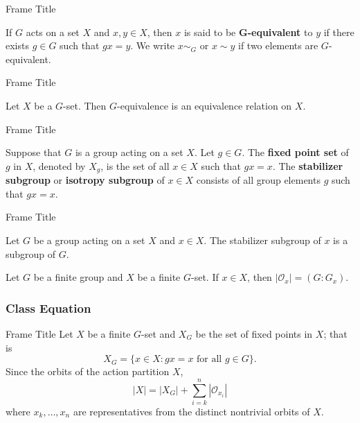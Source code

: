 \documentclass{beamer}
\begin{document}
\begin{frame}{Frame Title}
    \begin{definition}
        \justifying
        If $G$ acts on a set $X$ and $x, y \in X$, then $x$ is said to be \textbf{$\boldsymbol{G}$-equivalent} to $y$ if there exists $g \in G$ such that $gx = y$. We write $x \sim_G$ or $x \sim y$ if two elements are $G$-equivalent.
    \end{definition}
\end{frame}

\begin{frame}{Frame Title}
    \begin{theorem}
        \justifying
        Let $X$ be a $G$-set. Then $G$-equivalence is an equivalence relation on $X$. 
    \end{theorem}
\end{frame}

\begin{frame}{Frame Title}
    \begin{definition}
        \justifying
        Suppose that $G$ is a group acting on a set $X$. Let $g \in G$. The \textbf{fixed point set} of $g$ in $X$, denoted by $X_g$, is the set of all $x \in X$ such that $gx = x$. The \textbf{stabilizer subgroup} or \textbf{isotropy subgroup} of $x \in X$ consists of all group elements $g$ such that $gx = x$.
    \end{definition}
\end{frame}

\begin{frame}{Frame Title}
    \begin{theorem}
        \justifying
        Let $G$ be a group acting on a set $X$ and $x \in X$. The stabilizer subgroup of $x$ is a subgroup of $G$.
    \end{theorem}
    \pause
    \begin{theorem}
        \justifying
        Let $G$ be a finite group and $X$ be a finite $G$-set. If $x \in X$, then $|\mathcal{O}_x| = (G:G_x)$.
    \end{theorem}
\end{frame}

\subsubsection{Class Equation}

\begin{frame}{Frame Title}
    \justifying
    Let $X$ be a finite $G$-set and $X_G$ be the set of fixed points in $X$; that is
    \[X_G = \{x \in X: gx = x \text{ for all } g \in G\}.\]
    Since the orbits of the action partition $X$,
    \[|X| = |X_G| + \sum_{i = k}^n|\mathcal{O}_{x_i}|\]
    where $x_k,\dots,x_n$ are representatives from the distinct nontrivial orbits of $X$.
\end{frame}
\end{document}
